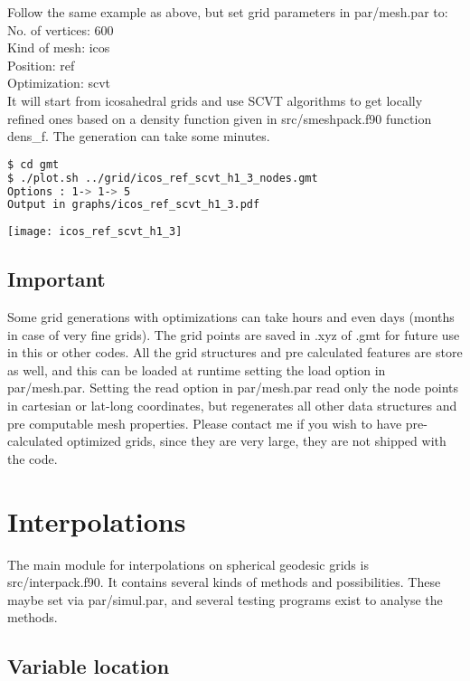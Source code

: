 \documentclass[a4paper,10pt]{article}
\begin{document}
Follow the same example as above, but set grid parameters in par/mesh.par to:
No. of vertices: 600 \\
Kind of mesh: icos \\
Position: ref \\
Optimization: scvt \\
It will start from icosahedral grids and use SCVT algorithms to get locally refined ones based on a density function given in src/smeshpack.f90 function dens\_f. The generation can take some minutes.

\begin{lstlisting}[language=bash]
$ cd gmt
$ ./plot.sh ../grid/icos_ref_scvt_h1_3_nodes.gmt 
Options : 1-> 1-> 5
Output in graphs/icos_ref_scvt_h1_3.pdf
\end{lstlisting}

\texttt{[image: icos\_ref\_scvt\_h1\_3]}

\subsection{Important}

Some grid generations with optimizations can take hours and even days (months in case of very fine grids). The grid points are saved in .xyz of .gmt for future use in this or other codes. All the grid structures and pre calculated features are store as well, and this can be loaded at runtime setting the load option in par/mesh.par. Setting the read option in par/mesh.par read only the node points in cartesian or lat-long coordinates, but regenerates all other data structures and pre computable mesh properties. Please contact me if you wish to have pre-calculated optimized grids, since they are very large, they are not shipped with the code.


\section{Interpolations}

The main module for interpolations on spherical geodesic grids is src/interpack.f90. It contains several kinds of methods and possibilities. These maybe set via par/simul.par, and several testing programs exist to analyse the methods.

\subsection{Variable location}
\end{document}
